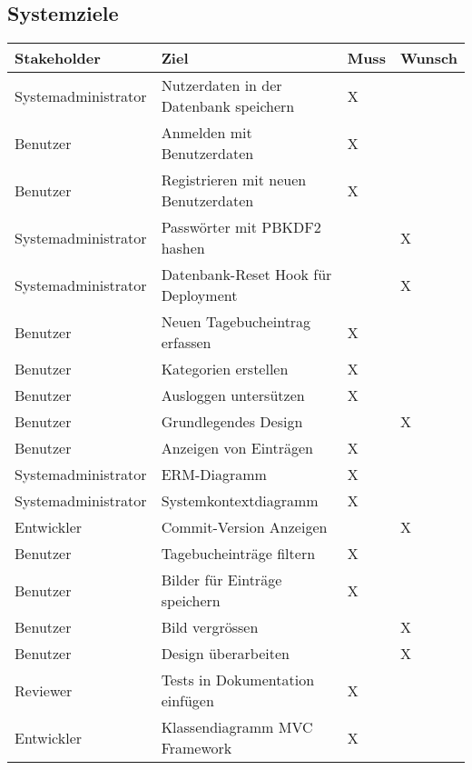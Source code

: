 \subsection{Systemziele}



\begin{tabular}{ |p{4cm}||p{7cm}|p{1cm}|p{1cm}|  }
    \hline
    Stakeholder & Ziel & Muss & Wunsch\\
    \hline
    Systemadministrator     &   Nutzerdaten in der Datenbank speichern  &   X   &       \\
    Benutzer                &   Anmelden mit Benutzerdaten              &   X   &       \\
    Benutzer                &   Registrieren mit neuen Benutzerdaten    &   X   &       \\
    Systemadministrator     &   Passwörter mit PBKDF2 hashen            &       &   X   \\
    Systemadministrator     &   Datenbank-Reset Hook für Deployment     &       &   X   \\
    Benutzer                &   Neuen Tagebucheintrag erfassen          &   X   &       \\
    Benutzer                &   Kategorien erstellen                    &   X   &       \\
    Benutzer                &   Ausloggen untersützen                   &   X   &       \\
    Benutzer                &   Grundlegendes Design                    &       &   X   \\
    Benutzer                &   Anzeigen von Einträgen                  &   X   &       \\
    Systemadministrator     &   ERM-Diagramm                            &   X   &       \\
    Systemadministrator     &   Systemkontextdiagramm                   &   X   &       \\
    Entwickler              &   Commit-Version Anzeigen                 &       &   X   \\
    Benutzer                &   Tagebucheinträge filtern                &   X   &       \\
    Benutzer                &   Bilder für Einträge speichern           &   X   &       \\
    Benutzer                &   Bild vergrössen                         &       &   X   \\
    Benutzer                &   Design überarbeiten                     &       &   X   \\
    Reviewer                &   Tests in Dokumentation einfügen         &   X   &       \\
    Entwickler              &   Klassendiagramm MVC Framework           &   X   &       \\
    \hline
   \end{tabular}
   
   